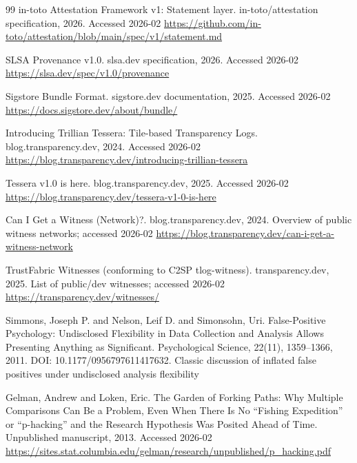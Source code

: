 \documentclass[11pt]{article}
\begin{document}
\begin{thebibliography}{99}
\newblock in-toto Attestation Framework v1: Statement layer.
\newblock in-toto/attestation specification, 2026.
\newblock Accessed 2026-02
\newblock \url{https://github.com/in-toto/attestation/blob/main/spec/v1/statement.md}

\newblock SLSA Provenance v1.0.
\newblock slsa.dev specification, 2026.
\newblock Accessed 2026-02
\newblock \url{https://slsa.dev/spec/v1.0/provenance}

\newblock Sigstore Bundle Format.
\newblock sigstore.dev documentation, 2025.
\newblock Accessed 2026-02
\newblock \url{https://docs.sigstore.dev/about/bundle/}

\newblock Introducing Trillian Tessera: Tile-based Transparency Logs.
\newblock blog.transparency.dev, 2024.
\newblock Accessed 2026-02
\newblock \url{https://blog.transparency.dev/introducing-trillian-tessera}

\newblock Tessera v1.0 is here.
\newblock blog.transparency.dev, 2025.
\newblock Accessed 2026-02
\newblock \url{https://blog.transparency.dev/tessera-v1-0-is-here}

\newblock Can I Get a Witness (Network)?.
\newblock blog.transparency.dev, 2024.
\newblock Overview of public witness networks; accessed 2026-02
\newblock \url{https://blog.transparency.dev/can-i-get-a-witness-network}

\newblock TrustFabric Witnesses (conforming to C2SP tlog-witness).
\newblock transparency.dev, 2025.
\newblock List of public/dev witnesses; accessed 2026-02
\newblock \url{https://transparency.dev/witnesses/}

Simmons, Joseph P. and Nelson, Leif D. and Simonsohn, Uri.
\newblock False-Positive Psychology: Undisclosed Flexibility in Data Collection and Analysis Allows Presenting Anything as Significant.
\newblock Psychological Science, 22(11), 1359--1366, 2011.
\newblock DOI: 10.1177/0956797611417632.
\newblock Classic discussion of inflated false positives under undisclosed analysis flexibility

Gelman, Andrew and Loken, Eric.
\newblock The Garden of Forking Paths: Why Multiple Comparisons Can Be a Problem, Even When There Is No ``Fishing Expedition'' or ``p-hacking'' and the Research Hypothesis Was Posited Ahead of Time.
\newblock Unpublished manuscript, 2013.
\newblock Accessed 2026-02
\newblock \url{https://sites.stat.columbia.edu/gelman/research/unpublished/p_hacking.pdf}


\end{thebibliography}
\end{document}
